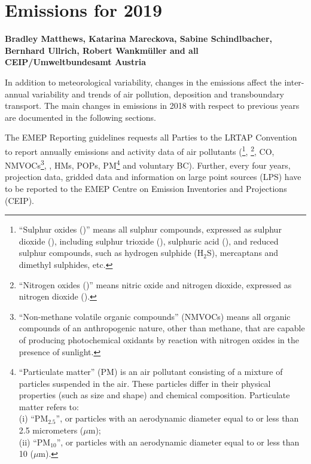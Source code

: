 \chapter[Emissions 2019]{Emissions for 2019}
\label{ch:emis2019}


{\bf{Bradley Matthews, Katarina Mareckova, Sabine Schindlbacher, Bernhard Ullrich, Robert Wankm\"uller and all CEIP/Umweltbundesamt Austria}}
\vspace{30pt}

In addition to meteorological variability, changes in the emissions
affect the inter-annual variability and trends of air pollution,
deposition and transboundary transport.  
The main changes in emissions in 2018 with respect to previous years
are documented in the following sections.



The EMEP Reporting guidelines \citep{UNECE2014} requests all Parties
to the LRTAP Convention to report annually emissions and activity data of air pollutants
(\sox\footnote{``Sulphur oxides (\sox)'' means all sulphur compounds,
  expressed as sulphur dioxide (\soii), including sulphur trioxide
  (\soiii), sulphuric acid (\sulacid), and reduced sulphur compounds,
  such as hydrogen sulphide (H${_2}$S), mercaptans and dimethyl
  sulphides, etc.}, \noii\footnote{``Nitrogen oxides (\nox)'' means
  nitric oxide and nitrogen dioxide, expressed as nitrogen dioxide
  (\noii).}, CO, NMVOCs\footnote{``Non-methane volatile organic
  compounds'' (NMVOCs) means all organic compounds of an anthropogenic
  nature, other than methane, that are capable of producing
  photochemical oxidants by reaction with nitrogen oxides in the
  presence of sunlight.}, \nhiii, HMs, POPs,
PM\footnote{``Particulate matter'' (PM) is an air pollutant
  consisting of a mixture of particles suspended in the air. These
  particles differ in their physical properties (such as size and
  shape) and chemical composition. Particulate matter refers to:\\  
(i) ``PM$_{2.5}$'', or particles with an aerodynamic diameter equal to or
  less than 2.5 micrometers ($\mu$m);\\ 
(ii) ``PM$_{10}$'', or particles with an aerodynamic diameter equal to or
  less than 10 ($\mu$m).} and voluntary BC). Further, every four years,
projection data, gridded data and information on large point sources (LPS)
have to be reported to the EMEP Centre on Emission Inventories and Projections (CEIP).


